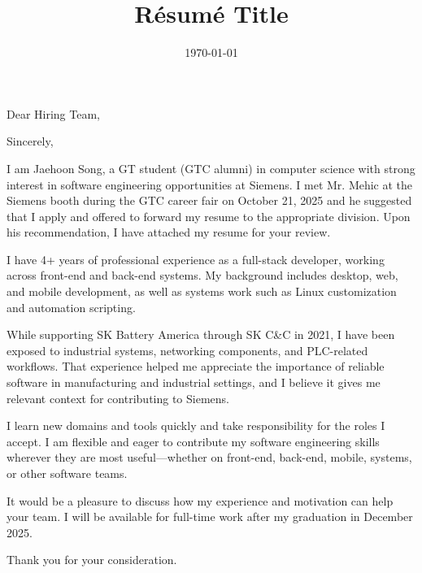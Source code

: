 \documentclass[11pt,letterpaper,roman]{moderncv}        %
\title{Résumé Title}                             %
\begin{document}
\date{\today}
\opening{Dear Hiring Team,}
\closing{Sincerely,}



% 







\makelettertitle


I am Jaehoon Song, a GT student (GTC alumni) in computer science with strong interest in software engineering 
opportunities at Siemens. 
I met Mr. Mehic at the Siemens booth during the GTC career fair on October 21, 2025 
and he suggested that I apply and offered to forward my resume to the appropriate division. 
Upon his recommendation, I have attached my resume for your review.

I have 4+ years of professional experience as a full-stack developer, working across 
front-end and back-end systems. My background includes desktop, web, and mobile 
development, as well as systems work such as Linux customization and automation scripting.

While supporting SK Battery America through SK C\&C in 2021, I have been exposed 
to industrial systems, networking components, and PLC-related workflows. 
That experience helped me appreciate the importance of reliable software in 
manufacturing and industrial settings, and I believe it gives me relevant context 
for contributing to Siemens.

I learn new domains and tools quickly and take responsibility for the roles 
I accept. I am flexible and eager to contribute my software engineering 
skills wherever they are most useful—whether on front-end, back-end, mobile, 
systems, or other software teams.

It would be a pleasure to discuss how my experience and motivation can 
help your team. I will be available for full-time work after my graduation in December 2025.

Thank you for your consideration.

\vspace{0.5cm}

\makeletterclosing
\end{document}
